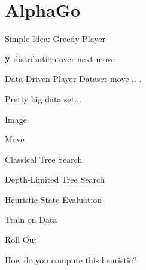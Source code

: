 \documentclass{beamer}
\begin{document}
\section{AlphaGo}

\begin{frame}
  
\end{frame}

\begin{frame}{Simple Idea: Greedy Player}
  
\end{frame}


\begin{frame}
  $\hat{\mathbf{y}}$ distribution over next move  
\end{frame}

\begin{frame}{Data-Driven Player}
  Dataset move  .. .
  
  Pretty big data set... 
\end{frame}

\begin{frame}{Image}
  
\end{frame}

\begin{frame}{Move}
  
\end{frame}


\begin{frame}{Classical Tree Search}
  
\end{frame}

\begin{frame}{Depth-Limited Tree Search}
  
\end{frame}


\begin{frame}{Heuristic State Evaluation}
  
\end{frame}

\begin{frame}{Train on Data}
  
\end{frame}


\begin{frame}{Roll-Out}
  
\end{frame}

\begin{frame}{How do you compute this heuristic?}
  
\end{frame}
\end{document}
